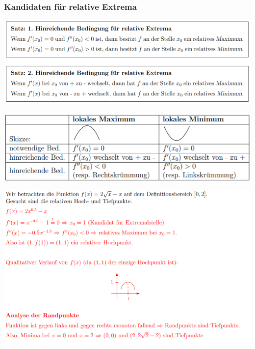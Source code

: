 \subsubsection{Kandidaten für relative Extrema}

\begin{center}
    \includegraphics[width=1\linewidth]{images/rel_extrem.png}
\end{center}

\begin{center}
    \includegraphics[width=1\linewidth]{images/rel2.png}
\end{center}

\begin{center}
    \includegraphics[width=1\linewidth]{images/relbsp.png}
\end{center}
\vfill
